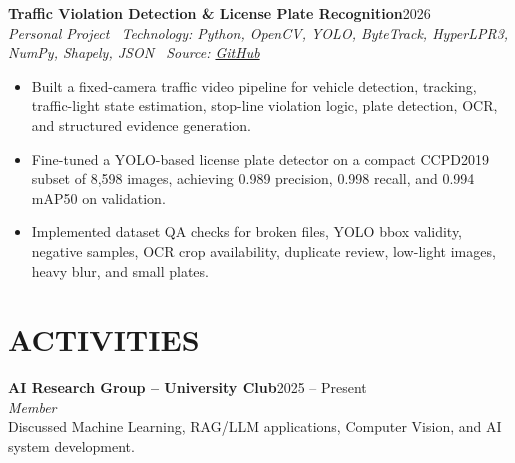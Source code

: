\documentclass[10pt,a4paper]{article}
\newenvironment{cvitems}{%
    \begin{itemize}[leftmargin=1.25em,itemsep=0pt,topsep=1pt,parsep=0pt]
}{%
    \end{itemize}
}
\newcommand{\entryhead}[2]{%
    \noindent\textbf{#1}\hfill #2\\[-2pt]
}
\newcommand{\entrysub}[1]{%
    \noindent\textit{#1}\\[-1pt]
}
\begin{document}
\entryhead{Traffic Violation Detection \& License Plate Recognition}{2026}
\entrysub{Personal Project \textbar\ Technology: Python, OpenCV, YOLO, ByteTrack, HyperLPR3, NumPy, Shapely, JSON \textbar\ Source: \href{https://github.com/NguyenKhacBao564/Traffic-Violation-Detection-and-License-Plate-Recognition}{GitHub}}
\begin{cvitems}
    \item Built a fixed-camera traffic video pipeline for vehicle detection, tracking, traffic-light state estimation, stop-line violation logic, plate detection, OCR, and structured evidence generation.
    \item Fine-tuned a YOLO-based license plate detector on a compact CCPD2019 subset of 8,598 images, achieving 0.989 precision, 0.998 recall, and 0.994 mAP50 on validation.
    \item Implemented dataset QA checks for broken files, YOLO bbox validity, negative samples, OCR crop availability, duplicate review, low-light images, heavy blur, and small plates.
\end{cvitems}

\section{ACTIVITIES}
\entryhead{AI Research Group -- University Club}{2025 -- Present}
\entrysub{Member}
Discussed Machine Learning, RAG/LLM applications, Computer Vision, and AI system development.
\end{document}
